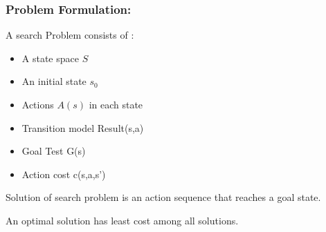 \documentclass{beamer}
\begin{document}
\begin{frame}
  \frametitle{Problem Formulation: }
  A search Problem consists of :
  \begin{itemize}
    \item A state space $S$
    \item An initial state $s_0$
    \item Actions $A(s)$ in each state
    \item Transition model Result(s,a)
    \item Goal Test G(s)
    \item Action cost c(s,a,s')
  \end{itemize}
  
  Solution of search problem is an action sequence that reaches a goal state. 
  
  An optimal solution has least cost among all solutions.

\end{frame}
\end{document}
